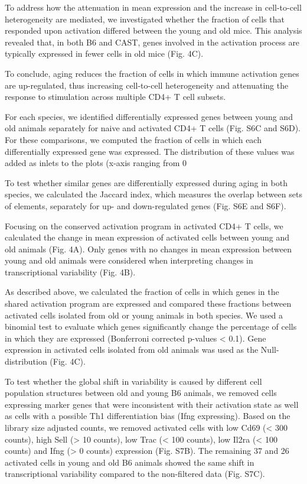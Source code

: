 To address how the attenuation in mean expression and the increase in cell-to-cell heterogeneity are mediated, we investigated whether the fraction of cells that responded upon activation differed between the young and old mice. This analysis revealed that, in both B6 and CAST, genes involved in the activation process are typically expressed in fewer cells in old mice (Fig. 4C).

To conclude, aging reduces the fraction of cells in which immune activation genes are up-regulated, thus increasing cell-to-cell heterogeneity and attenuating the response to stimulation across multiple CD4+ T cell subsets.

For each species, we identified differentially expressed genes between young and old animals separately for naive and activated CD4+ T cells (Fig. S6C and S6D). For these comparisons, we computed the fraction of cells in which each differentially expressed gene was expressed. The distribution of these values was added as inlets to the plots (x-axis ranging from 0%

To test whether similar genes are differentially expressed during aging in both species, we calculated the Jaccard index, which measures the overlap between sets of elements, separately for up- and down-regulated genes (Fig. S6E and S6F).

Focusing on the conserved activation program in activated CD4+ T cells, we calculated the change in mean expression of activated cells between young and old animals (Fig. 4A). Only genes with no changes in mean expression between young and old animals were considered when interpreting changes in transcriptional variability (Fig. 4B). 

As described above, we calculated the fraction of cells in which genes in the shared activation program are expressed and compared these fractions between activated cells isolated from old or young animals in both species. We used a binomial test to evaluate which genes significantly change the percentage of cells in which they are expressed (Bonferroni corrected p-values < 0.1). Gene expression in activated cells isolated from old animals was used as the Null-distribution (Fig. 4C). 

To test whether the global shift in variability is caused by different cell population structures between old and young B6 animals, we removed cells expressing marker genes that were inconsistent with their activation state as well as cells with a possible Th1 differentiation bias (Ifng expressing). Based on the library size adjusted counts, we removed activated cells with low Cd69 (< 300 counts), high Sell (> 10 counts), low Trac (< 100 counts), low Il2ra (< 100 counts) and Ifng (> 0 counts) expression (Fig. S7B). The remaining 37 and 26 activated cells in young and old B6 animals showed the same shift in transcriptional variability compared to the non-filtered data (Fig. S7C). 

